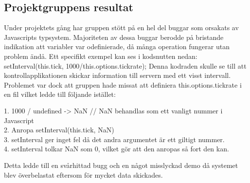 \subsection{Projektgruppens resultat}

Under projektets gång har gruppen stött på en hel del buggar som orsakats av Javascripts typsystem. Majoriteten av dessa buggar berodde på bristande indikation att variabler var odefinierade, då många operation fungerar utan problem ändå. Ett specifikt exempel kan ses i kodsnutten nedan:
setInterval(this.tick, 1000/this.options.tickrate);
Denna kodraden skulle se till att kontrollapplikationen skickar information till servern med ett visst intervall. Problemet var dock att gruppen hade missat att definiera this.options.tickrate i en fil vilket ledde till följande istället:

1. 1000 / undefined -> NaN // NaN behandlas som ett vanligt nummer i Javascript\\
2. Anropa setInterval(this.tick, NaN)\\
3. setInterval ger inget fel då det andra argumentet är ett giltigt nummer.\\
4. setInterval tolkar NaN som 0, vilket gör att den anropas så fort den kan.

Detta ledde till en svårhittad bugg och en något misslyckad demo då systemet blev överbelastat eftersom för mycket data skickades.